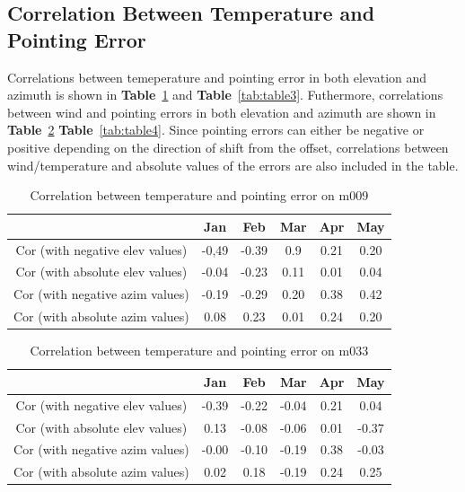 \documentclass{article}
\begin{document}
\subsection{Correlation Between Temperature and Pointing Error }
Correlations between temeperature and pointing error in both elevation and azimuth is shown in \textbf{Table}~\ref{tab:table1} and \textbf{Table}~\ref{tab:table3}. Futhermore, correlations between wind and pointing errors in both elevation and azimuth are shown in \textbf{Table}~\ref{tab:table2} \textbf{Table}~\ref{tab:table4}.  Since pointing errors can either be negative or positive depending on the direction of shift from the offset, correlations between wind/temperature and absolute values of the errors are also included in the table.
\begin{table}[H]
	\caption{Correlation between temperature and pointing error on m009}
	\label{tab:table1}
	\centering	
	\begin{tabular}[b]{|c|c|c|c|c|c|}
		\hline
		&\textbf{Jan}	& \textbf{Feb}& \textbf{Mar}&\textbf{Apr}&\textbf{May}\\
		\hline
		Cor (with negative elev values) &-0,49&-0.39&0.9&0.21&0.20\\
		\hline
		Cor (with absolute elev values) &-0.04&-0.23&0.11&0.01&0.04\\
		\hline
		Cor (with negative azim values) &-0.19&-0.29&0.20&0.38&0.42\\	
		\hline
		Cor (with absolute azim values) &0.08&0.23&0.01&0.24&0.20\\	
		\hline
	\end{tabular}	
\end{table}
\begin{table}[H]
	\caption{Correlation between temperature and pointing error on m033}
	\label{tab:table2}
	\centering	
	\begin{tabular}[b]{|c|c|c|c|c|c|}
		\hline
		&\textbf{Jan}	& \textbf{Feb}& \textbf{Mar}&\textbf{Apr}&\textbf{May}\\
		\hline
		Cor (with negative elev values) &-0.39&-0.22&-0.04&0.21&0.04\\
		\hline
		Cor (with absolute elev values) &0.13&-0.08&-0.06&0.01&-0.37\\
		\hline
		Cor (with negative azim values) &-0.00&-0.10&-0.19&0.38&-0.03\\	
		\hline
		Cor (with absolute azim values) &0.02&0.18&-0.19&0.24&0.25\\	
		\hline
	\end{tabular}	
\end{table}
\end{document}
